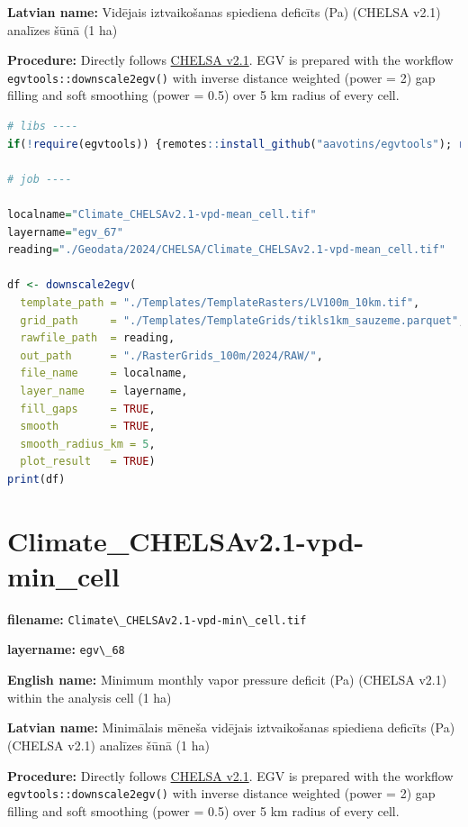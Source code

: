 \documentclass[
]{book}
\newcommand{\passthrough}[1]{#1}
\begin{document}
\textbf{Latvian name:} Vidējais iztvaikošanas spiediena deficīts (Pa) (CHELSA v2.1) analīzes šūnā (1 ha)

\textbf{Procedure:} Directly follows \hyperref[Ch04.11]{CHELSA v2.1}. EGV is prepared with the
workflow \passthrough{\lstinline!egvtools::downscale2egv()!} with inverse distance weighted (power = 2)
gap filling and soft smoothing (power = 0.5) over 5 km radius of every cell.

\begin{lstlisting}[language=R]
# libs ----
if(!require(egvtools)) {remotes::install_github("aavotins/egvtools"); require(egvtools)}

# job ----

localname="Climate_CHELSAv2.1-vpd-mean_cell.tif"
layername="egv_67"
reading="./Geodata/2024/CHELSA/Climate_CHELSAv2.1-vpd-mean_cell.tif"

df <- downscale2egv(
  template_path = "./Templates/TemplateRasters/LV100m_10km.tif",
  grid_path     = "./Templates/TemplateGrids/tikls1km_sauzeme.parquet",
  rawfile_path  = reading,
  out_path      = "./RasterGrids_100m/2024/RAW/",
  file_name     = localname,
  layer_name    = layername,
  fill_gaps     = TRUE,
  smooth        = TRUE,
  smooth_radius_km = 5,
  plot_result   = TRUE)
print(df)
\end{lstlisting}

\section{Climate\_CHELSAv2.1-vpd-min\_cell}\label{ch06.068}

\textbf{filename:} \passthrough{\lstinline!Climate\_CHELSAv2.1-vpd-min\_cell.tif!}

\textbf{layername:} \passthrough{\lstinline!egv\_68!}

\textbf{English name:} Minimum monthly vapor pressure deficit (Pa) (CHELSA v2.1) within the analysis cell (1 ha)

\textbf{Latvian name:} Minimālais mēneša vidējais iztvaikošanas spiediena deficīts (Pa) (CHELSA v2.1) analīzes šūnā (1 ha)

\textbf{Procedure:} Directly follows \hyperref[Ch04.11]{CHELSA v2.1}. EGV is prepared with the
workflow \passthrough{\lstinline!egvtools::downscale2egv()!} with inverse distance weighted (power = 2)
gap filling and soft smoothing (power = 0.5) over 5 km radius of every cell.
\end{document}
